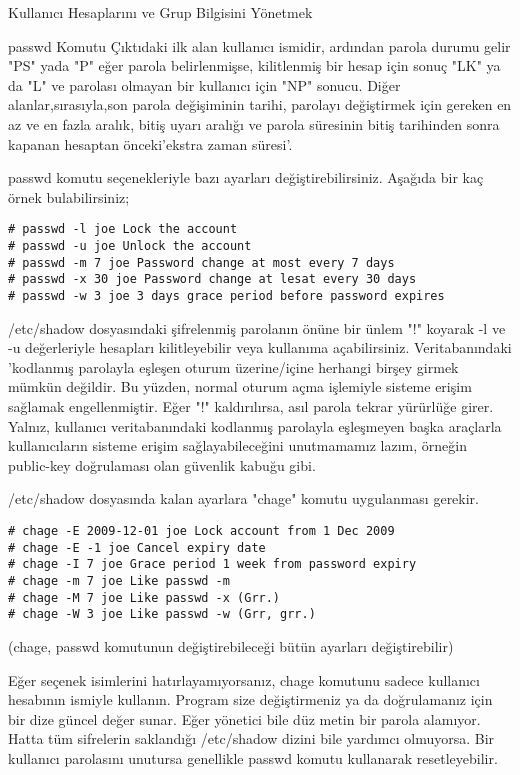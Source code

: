 \begin{section}{Kullanıcı Hesaplarını ve Grup Bilgisini Yönetmek}
\begin{subsection}{passwd Komutu}
Çıktıdaki ilk alan kullanıcı ismidir, ardından parola durumu gelir "PS" yada "P" eğer parola belirlenmişse, kilitlenmiş bir hesap için sonuç "LK" ya da "L" ve parolası olmayan bir kullanıcı için "NP" sonucu. Diğer alanlar,sırasıyla,son parola değişiminin tarihi, parolayı değiştirmek için gereken en az ve en fazla aralık, bitiş uyarı aralığı ve parola süresinin bitiş tarihinden sonra kapanan hesaptan önceki'ekstra zaman süresi'.

passwd komutu seçenekleriyle bazı ayarları değiştirebilirsiniz. Aşağıda bir kaç örnek bulabilirsiniz; 
\begin{verbatim}
# passwd -l joe Lock the account
# passwd -u joe Unlock the account
# passwd -m 7 joe Password change at most every 7 days
# passwd -x 30 joe Password change at lesat every 30 days
# passwd -w 3 joe 3 days grace period before password expires
\end{verbatim}

/etc/shadow dosyasındaki şifrelenmiş parolanın önüne bir ünlem "!" koyarak -l ve -u değerleriyle hesapları kilitleyebilir veya kullanıma açabilirsiniz. Veritabanındaki 'kodlanmış parolayla eşleşen oturum üzerine/içine herhangi birşey girmek mümkün değildir. Bu yüzden, normal oturum açma işlemiyle sisteme erişim sağlamak engellenmiştir. Eğer "!" kaldırılırsa, asıl parola tekrar yürürlüğe girer. Yalnız, kullanıcı veritabanındaki kodlanmış parolayla eşleşmeyen başka araçlarla kullanıcıların sisteme erişim sağlayabileceğini unutmamamız lazım, örneğin public-key doğrulaması olan güvenlik kabuğu gibi.

/etc/shadow dosyasında kalan ayarlara "chage" komutu uygulanması gerekir.
\begin{verbatim}
# chage -E 2009-12-01 joe Lock account from 1 Dec 2009
# chage -E -1 joe Cancel expiry date
# chage -I 7 joe Grace period 1 week from password expiry
# chage -m 7 joe Like passwd -m
# chage -M 7 joe Like passwd -x (Grr.)
# chage -W 3 joe Like passwd -w (Grr, grr.)
\end{verbatim}

(chage, passwd komutunun değiştirebileceği bütün ayarları değiştirebilir)

Eğer seçenek isimlerini hatırlayamıyorsanız, chage komutunu sadece kullanıcı hesabının ismiyle kullanın. Program size değiştirmeniz ya da doğrulamanız için bir dize güncel değer sunar. Eğer yönetici bile düz metin bir parola alamıyor. Hatta tüm sifrelerin saklandığı /etc/shadow dizini bile yardımcı olmuyorsa. Bir kullanıcı parolasını unutursa genellikle passwd komutu kullanarak resetleyebilir.


\end{subsection}
\end{section}
